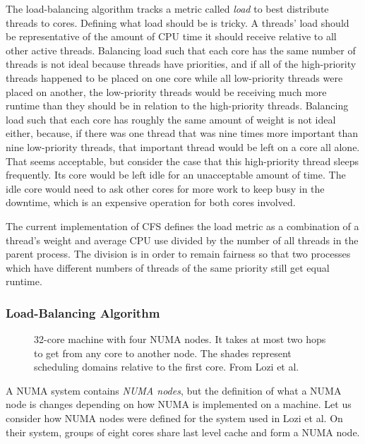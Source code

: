 \documentclass{sig-alternate}
\begin{document}
The load-balancing algorithm tracks a metric called \emph{load} to best distribute threads to cores. Defining what load should be is tricky. A threads' load should be representative of the amount of CPU time it should receive relative to all other active threads. Balancing load such that each core has the same number of threads is not ideal because threads have priorities, and if all of the high-priority threads happened to be placed on one core while all low-priority threads were placed on another, the low-priority threads would be receiving much more runtime than they should be in relation to the high-priority threads. Balancing load such that each core has roughly the same amount of weight is not ideal either, because, if there was one thread that was nine times more important than nine low-priority threads, that important thread would be left on a core all alone. That seems acceptable, but consider the case that this high-priority thread sleeps frequently. Its core would be left idle for an unacceptable amount of time. The idle core would need to ask other cores for more work to keep busy in the downtime, which is an expensive operation for both cores involved.~\cite{Lozi:2016}

The current implementation of CFS defines the load metric as a combination of a thread's weight and average CPU use divided by the number of all threads in the parent process. The division is in order to remain fairness so that two processes which have different numbers of threads of the same priority still get equal runtime.~\cite{Lozi:2016}

\subsubsection{Load-Balancing Algorithm}
\label{sec:loadbalancealg}

\begin{figure}
\centering
{}
\caption{32-core machine with four NUMA nodes. It takes at most two hops to get from any core to another node. The shades represent scheduling domains relative to the first core. From Lozi et al.~\cite{Lozi:2016}}
\label{fig:domains}
\end{figure}

A NUMA system contains \emph{NUMA nodes}, but the definition of what a NUMA node is changes depending on how NUMA is implemented on a machine. Let us consider how NUMA nodes were defined for the system used in Lozi et al. On their system, groups of eight cores share last level cache and form a NUMA node.
\end{document}
